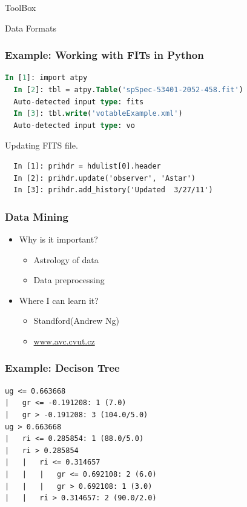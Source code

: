 \documentclass[fleqn]{beamer}
\begin{document}
\begin{section}{ToolBox}
\begin{section}{Data Formats}




\begin{frame}[containsverbatim]\frametitle{Example: Working with FITs
    in Python}
\begin{lstlisting}[language=SQL]
  In [1]: import atpy
  In [2]: tbl = atpy.Table('spSpec-53401-2052-458.fit')
  Auto-detected input type: fits
  In [3]: tbl.write('votableExample.xml')
  Auto-detected input type: vo
\end{lstlisting}
Updating FITS file.

\begin{lstlisting}
  In [1]: prihdr = hdulist[0].header
  In [2]: prihdr.update('observer', 'Astar')
  In [3]: prihdr.add_history('Updated  3/27/11')
\end{lstlisting}

\end{frame}
\end{section}


  \begin{frame}\frametitle{Data Mining}
  \begin{itemize}
    \item{Why is it important?}
      \begin{itemize}
      \item Astrology of data
      \item Data preprocessing
      \end{itemize}
    \item{Where I can learn it?}
      \begin{itemize}
      \item {Standford(Andrew Ng)}
      \item {\url{www.avc.cvut.cz}}
      \end{itemize}
  \end{itemize}
  \end{frame}

\begin{frame}[containsverbatim]\frametitle{Example: Decison Tree}

\begin{lstlisting}
ug <= 0.663668
|   gr <= -0.191208: 1 (7.0)
|   gr > -0.191208: 3 (104.0/5.0)
ug > 0.663668
|   ri <= 0.285854: 1 (88.0/5.0)
|   ri > 0.285854
|   |   ri <= 0.314657
|   |   |   gr <= 0.692108: 2 (6.0)
|   |   |   gr > 0.692108: 1 (3.0)
|   |   ri > 0.314657: 2 (90.0/2.0)
\end{lstlisting}

\end{frame}


\end{section}
\end{document}
